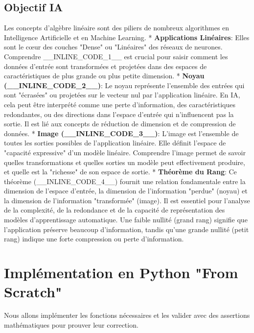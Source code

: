 \documentclass{report}
\begin{document}
\subsection*{Objectif IA}
Les concepts d'algèbre linéaire sont des piliers de nombreux algorithmes en Intelligence Artificielle et en Machine Learning.
*   \textbf{Applications Linéaires}: Elles sont le cœur des couches "Dense" ou "Linéaires" des réseaux de neurones. Comprendre \_\_INLINE\_CODE\_1\_\_ est crucial pour saisir comment les données d'entrée sont transformées et projetées dans des espaces de caractéristiques de plus grande ou plus petite dimension.
*   \textbf{Noyau (\_\_INLINE\_CODE\_2\_\_)}: Le noyau représente l'ensemble des entrées qui sont "écrasées" ou projetées sur le vecteur nul par l'application linéaire. En IA, cela peut être interprété comme une perte d'information, des caractéristiques redondantes, ou des directions dans l'espace d'entrée qui n'influencent pas la sortie. Il est lié aux concepts de réduction de dimension et de compression de données.
*   \textbf{Image (\_\_INLINE\_CODE\_3\_\_)}: L'image est l'ensemble de toutes les sorties possibles de l'application linéaire. Elle définit l'espace de "capacité expressive" d'un modèle linéaire. Comprendre l'image permet de savoir quelles transformations et quelles sorties un modèle peut effectivement produire, et quelle est la "richesse" de son espace de sortie.
*   \textbf{Théorème du Rang}: Ce théorème (\_\_INLINE\_CODE\_4\_\_) fournit une relation fondamentale entre la dimension de l'espace d'entrée, la dimension de l'information "perdue" (noyau) et la dimension de l'information "transformée" (image). Il est essentiel pour l'analyse de la complexité, de la redondance et de la capacité de représentation des modèles d'apprentissage automatique. Une faible nullité (grand rang) signifie que l'application préserve beaucoup d'information, tandis qu'une grande nullité (petit rang) indique une forte compression ou perte d'information.

\section*{Implémentation en Python "From Scratch"}

Nous allons implémenter les fonctions nécessaires et les valider avec des assertions mathématiques pour prouver leur correction.
\end{document}
